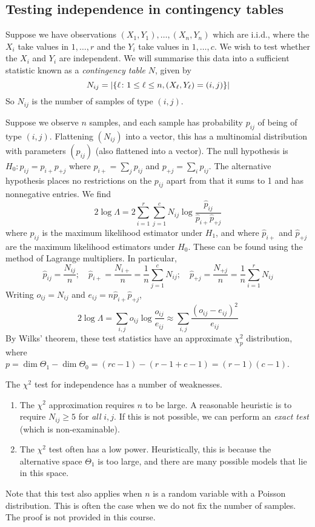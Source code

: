 \subsection{Testing independence in contingency tables}
Suppose we have observations \( (X_1, Y_1), \dots, (X_n, Y_n) \) which are i.i.d., where the \( X_i \) take values in \( 1, \dots, r \) and the \( Y_i \) take values in \( 1, \dots, c \).
We wish to test whether the \( X_i \) and \( Y_i \) are independent.
We will summarise this data into a sufficient statistic known as a \textit{contingency table} \( N \), given by
\[ N_{ij} = \abs{ \qty{\ell \colon 1 \leq \ell \leq n, (X_\ell, Y_\ell) = (i,j)} } \]
So \( N_{ij} \) is the number of samples of type \( (i,j) \).
\begin{example}
	Suppose we observe \( n \) samples, and each sample has probability \( p_{ij} \) of being of type \( (i,j) \).
	Flattening \( (N_{ij}) \) into a vector, this has a multinomial distribution with parameters \( (p_{ij}) \) (also flattened into a vector).
	The null hypothesis is \( H_0 \colon p_{ij} = p_{i+} p_{+j} \) where \( p_{i+} = \sum_j p_{ij} \) and \( p_{+j} = \sum_i p_{ij} \).
	The alternative hypothesis places no restrictions on the \( p_{ij} \) apart from that it sums to 1 and has nonnegative entries.
	We find
	\[ 2 \log \Lambda = 2\sum_{i=1}^r \sum_{j=1}^c N_{ij} \log \frac{\hat p_{ij}}{\hat p_{i+} \hat p_{+j}} \]
	where \( \hat p_{ij} \) is the maximum likelihood estimator under \( H_1 \), and where \( \hat p_{i+} \) and \( \hat p_{+j} \) are the maximum likelihood estimators under \( H_0 \).
	These can be found using the method of Lagrange multipliers.
	In particular,
	\[ \hat p_{ij} = \frac{N_{ij}}{n};\quad \hat p_{i+} = \frac{N_{i+}}{n} = \frac{1}{n} \sum_{j=1}^c N_{ij};\quad \hat p_{+j} = \frac{N_{+j}}{n} = \frac{1}{n} \sum_{i=1}^r N_{ij} \]
	Writing \( o_{ij} = N_{ij} \) and \( e_{ij} = n \hat p_{i+} \hat p_{+j} \),
	\[ 2 \log \Lambda = \sum_{i,j} o_{ij} \log \frac{o_{ij}}{e_{ij}} \approx \sum_{i,j} \frac{(o_{ij} - e_{ij})^2}{e_{ij}} \]
	By Wilks' theorem, these test statistics have an approximate \( \chi^2_p \) distribution, where \( p = \dim \Theta_1 - \dim \Theta_0 = (rc-1) - (r-1 + c-1) = (r-1)(c-1) \).
\end{example}
The \( \chi^2 \) test for independence has a number of weaknesses.
\begin{enumerate}
	\item The \( \chi^2 \) approximation requires \( n \) to be large.
		A reasonable heuristic is to require \( N_{ij} \geq 5 \) for \textit{all} \( i,j \).
		If this is not possible, we can perform an \textit{exact test} (which is non-examinable).
	\item The \( \chi^2 \) test often has a low power.
		Heuristically, this is because the alternative space \( \Theta_1 \) is too large, and there are many possible models that lie in this space.
\end{enumerate}
Note that this test also applies when \( n \) is a random variable with a Poisson distribution.
This is often the case when we do not fix the number of samples.
The proof is not provided in this course.

